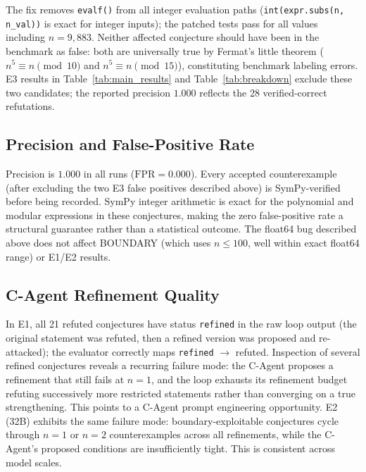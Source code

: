 The fix removes \texttt{evalf()} from all integer evaluation paths
(\texttt{int(expr.subs(n, n\_val))} is exact for integer inputs);
the patched tests pass for all values including $n = 9{,}883$.
Neither affected conjecture should have been in the benchmark as false:
both are universally true by Fermat's little theorem ($n^5 \equiv n \pmod{10}$
and $n^5 \equiv n \pmod{15}$), constituting benchmark labeling errors.
E3 results in Table~\ref{tab:main_results} and Table~\ref{tab:breakdown}
exclude these two candidates; the reported precision $1.000$ reflects the
28 verified-correct refutations.

\subsection{Precision and False-Positive Rate}

Precision is $1.000$ in all runs ($\text{FPR} = 0.000$).
Every accepted counterexample (after excluding the two E3 false positives
described above) is SymPy-verified before being recorded.
SymPy integer arithmetic is exact for the polynomial and modular
expressions in these conjectures, making the zero false-positive rate
a structural guarantee rather than a statistical outcome.
The float64 bug described above does not affect BOUNDARY (which uses
$n \leq 100$, well within exact float64 range) or E1/E2 results.

\subsection{C-Agent Refinement Quality}

In E1, all 21 refuted conjectures have status \texttt{refined} in the raw
loop output (the original statement was refuted, then a refined version was
proposed and re-attacked); the evaluator correctly maps \texttt{refined} $\to$ refuted.
Inspection of several refined conjectures reveals a recurring failure mode:
the C-Agent proposes a refinement that still fails at $n=1$, and the loop
exhausts its refinement budget refuting successively more restricted statements
rather than converging on a true strengthening.
This points to a C-Agent prompt engineering opportunity.
E2 (32B) exhibits the same failure mode: boundary-exploitable conjectures
cycle through $n=1$ or $n=2$ counterexamples across all refinements, while
the C-Agent's proposed conditions are insufficiently tight. This is consistent
across model scales.
